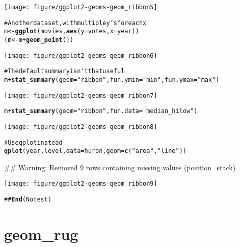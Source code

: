 \documentclass[a4paper,titlepage]{tufte-handout}\usepackage{graphicx, color}
\makeatletter
\def\maxwidth{ %
  \ifdim\Gin@nat@width>\linewidth
    \linewidth
  \else
    \Gin@nat@width
  \fi
}
\newcommand{\hlfunctioncall}[1]{\textcolor[rgb]{0.501960784313725,0,0.329411764705882}{\textbf{#1}}}%
\newcommand{\hlstring}[1]{\textcolor[rgb]{0.6,0.6,1}{#1}}%
\newcommand{\hlcomment}[1]{\textcolor[rgb]{0.180392156862745,0.6,0.341176470588235}{#1}}%
\newenvironment{kframe}{%
 \def\at@end@of@kframe{}%
 \ifinner\ifhmode%
  \def\at@end@of@kframe{\end{minipage}}%
  \begin{minipage}{\columnwidth}%
 \fi\fi%
 \def\FrameCommand##1{\hskip\@totalleftmargin \hskip-\fboxsep
 \colorbox{shadecolor}{##1}\hskip-\fboxsep
     \hskip-\linewidth \hskip-\@totalleftmargin \hskip\columnwidth}%
 \MakeFramed {\advance\hsize-\width
   \@totalleftmargin\z@ \linewidth\hsize
   \@setminipage}}%
 {\par\unskip\endMakeFramed%
 \at@end@of@kframe}
\newenvironment{knitrout}{}{} %
\makeatother
\begin{document}
\begin{knitrout}
\begin{kframe}
\begin{alltt}
\end{alltt}
\end{kframe}\texttt{[image: figure/ggplot2-geoms-geom\_ribbon5]} \begin{kframe}\begin{alltt}
\hlcomment{# Another data set, with multiple y's for each x}
m <- \hlfunctioncall{ggplot}(movies, \hlfunctioncall{aes}(y=votes, x=year))
(m <- m + \hlfunctioncall{geom_point}())
\end{alltt}
\end{kframe}\texttt{[image: figure/ggplot2-geoms-geom\_ribbon6]} \begin{kframe}\begin{alltt}
\hlcomment{# The default summary isn't that useful}
m + \hlfunctioncall{stat_summary}(geom=\hlstring{"ribbon"}, fun.ymin=\hlstring{"min"}, fun.ymax=\hlstring{"max"})
\end{alltt}
\end{kframe}\texttt{[image: figure/ggplot2-geoms-geom\_ribbon7]} \begin{kframe}\begin{alltt}
m + \hlfunctioncall{stat_summary}(geom=\hlstring{"ribbon"}, fun.data=\hlstring{"median_hilow"})
\end{alltt}
\end{kframe}\texttt{[image: figure/ggplot2-geoms-geom\_ribbon8]} \begin{kframe}\begin{alltt}
\hlcomment{# Use qplot instead}
\hlfunctioncall{qplot}(year, level, data=huron, geom=\hlfunctioncall{c}(\hlstring{"area"}, \hlstring{"line"}))
\end{alltt}


{\ttfamily\noindent\textcolor{warningcolor}{\#\# Warning: Removed 9 rows containing missing values (position\_stack).}}\end{kframe}\texttt{[image: figure/ggplot2-geoms-geom\_ribbon9]} \begin{kframe}\begin{alltt}
\hlcomment{## \hlfunctioncall{End}(No test)}
\end{alltt}
\end{kframe}
\end{knitrout}


\section{geom\_rug}
\end{document}
